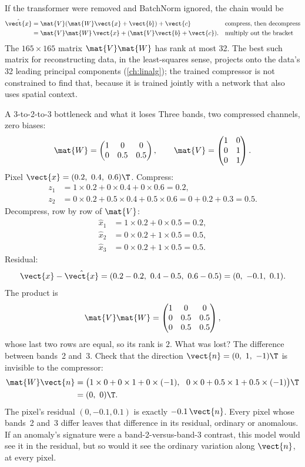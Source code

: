 If the transformer were removed and BatchNorm ignored, the chain would be
\begin{align*}
\hat{\vect{x}} &= \mat{V}(\mat{W}\vect{x} + \vect{b}) + \vect{c}
  && \text{compress, then decompress}\\
&= \mat{V}\mat{W}\,\vect{x} + (\mat{V}\vect{b} + \vect{c}).
  && \text{multiply out the bracket}
\end{align*}
The $165\times165$ matrix $\mat{V}\mat{W}$ has rank at most 32. The best such matrix for reconstructing
data, in the least-squares sense, projects onto the data's 32 leading principal components
(\cref{ch:linalg}); the trained compressor is not constrained to find that, because it is trained jointly
with a network that also uses spatial context.

\begin{worked}[label={we:compressor:lost}]{A 3-to-2-to-3 bottleneck and what it loses}
Three bands, two compressed channels, zero biases:
\[
\mat{W} = \begin{pmatrix}1 & 0 & 0\\ 0 & 0.5 & 0.5\end{pmatrix},\qquad
\mat{V} = \begin{pmatrix}1 & 0\\ 0 & 1\\ 0 & 1\end{pmatrix}.
\]
Pixel $\vect{x} = (0.2,\ 0.4,\ 0.6)\T$. Compress:
\begin{align*}
z_1 &= 1\times0.2 + 0\times0.4 + 0\times0.6 = 0.2,\\
z_2 &= 0\times0.2 + 0.5\times0.4 + 0.5\times0.6 = 0 + 0.2 + 0.3 = 0.5.
\end{align*}
Decompress, row by row of $\mat{V}$:
\begin{align*}
\hat{x}_1 &= 1\times0.2 + 0\times0.5 = 0.2,\\
\hat{x}_2 &= 0\times0.2 + 1\times0.5 = 0.5,\\
\hat{x}_3 &= 0\times0.2 + 1\times0.5 = 0.5.
\end{align*}
Residual:
\[
\vect{x} - \hat{\vect{x}} = (0.2-0.2,\ 0.4-0.5,\ 0.6-0.5) = (0,\ -0.1,\ 0.1).
\]
The product is
\[
\mat{V}\mat{W} = \begin{pmatrix}1&0&0\\0&0.5&0.5\\0&0.5&0.5\end{pmatrix},
\]
whose last two rows are equal, so its rank is $2$\tagC. What was lost? The difference between bands~2
and~3. Check that the direction $\vect{n} = (0,\ 1,\ -1)\T$ is invisible to the compressor:
\begin{align*}
\mat{W}\vect{n} &= \bigl(1\times0 + 0\times1 + 0\times(-1),\ \ 0\times0 + 0.5\times1 + 0.5\times(-1)\bigr)\T\\
&= (0,\ 0)\T .
\end{align*}
The pixel's residual $(0, -0.1, 0.1)$ is exactly $-0.1\,\vect{n}$. Every pixel whose bands~2 and~3
differ leaves that difference in its residual, ordinary or anomalous. If an anomaly's signature were a
band-2-versus-band-3 contrast, this model would see it in the residual, but so would it see the
ordinary variation along $\vect{n}$, at every pixel.
\end{worked}

